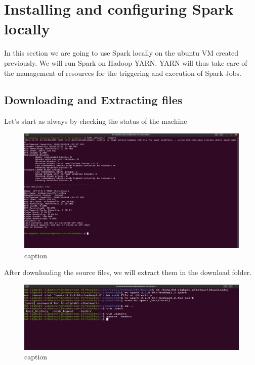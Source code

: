 \chapter{Installing and configuring Spark locally}
\par In this section we are going to use Spark locally on the ubuntu VM created previously. We will run
Spark on Hadoop YARN. YARN will thus take care of the management of resources for the triggering and
execution of Spark Jobs. 
\begin{spacing}{1.2}
\section{Downloading and Extracting files}

\par Let's start as always by checking the status of the machine
\\
\begin{figure}[!htb] 
\begin{center} 
\includegraphics[width=1\linewidth]{Big_Data/Spark/Spark Installation & Configuration/Live datanode.jpg} 
\end{center} 
\caption{caption} 
\end{figure} 
\FloatBarrier



\par After downloading the source files, we will extract them in the download folder.
\\
\begin{figure}[!htb] 
\begin{center} 
\includegraphics[width=1\linewidth]{Big_Data/Spark/Spark Installation & Configuration/Extracting Spark.jpg} 
\end{center} 
\caption{caption} 
\end{figure} 
\FloatBarrier


\end{spacing}
